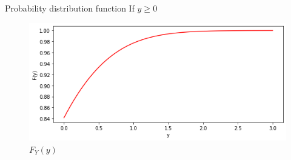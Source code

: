 \documentclass{beamer}
\begin{document}
\begin{frame}{Probability distribution function}
If $y \ge 0$
    \begin{figure}[h]
    \centering
    \includegraphics[width=\columnwidth]{figures/F3.png}
    \caption{$F_Y(y)$}
    \label{Fig 4}
    \end{figure}
\end{frame}
\end{document}
